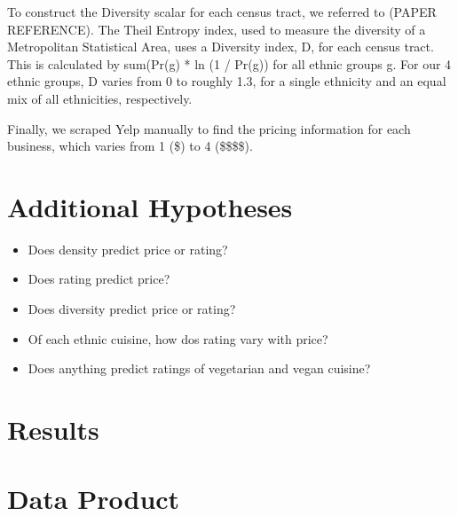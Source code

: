 \documentclass[11pt,twocolumn]{article}
\begin{document}
To construct the Diversity scalar for each census tract, we referred to (PAPER REFERENCE). The Theil Entropy index, used to measure the diversity of a Metropolitan Statistical Area, uses a Diversity index, D, for each census tract. This is calculated by sum(Pr(g) * ln (1 / Pr(g)) for all ethnic groups g. For our 4 ethnic groups, D varies from 0 to roughly 1.3, for a single ethnicity and an equal mix of all ethnicities, respectively. 

Finally, we scraped Yelp manually to find the pricing information for each business, which varies from 1 (\$) to 4 (\$\$\$\$).

\section{Additional Hypotheses}
\begin{itemize}
\item Does density predict price or rating?
\item Does rating predict price?
\item Does diversity predict price or rating?
\item Of each ethnic cuisine, how dos rating vary with price?
\item Does anything predict ratings of vegetarian and vegan cuisine?
\end{itemize}
\section{Results}


\section{Data Product}
\end{document}
